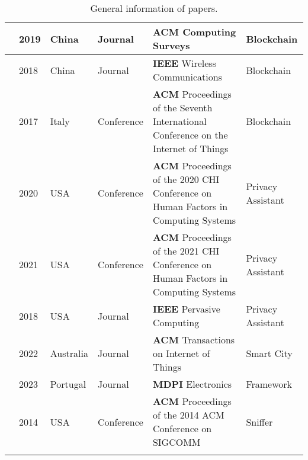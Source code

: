 \begin{footnotesize}
\begin{longtable}{p{1.2cm} p{1cm} p{1.6cm} p{3.2cm} p{5cm} p{3cm}}
        \cite{zhang2019security} & 2019 & China & Journal & \textbf{ACM} Computing Surveys & Blockchain \\
        \hline
        \cite{yu2018blockchain} & 2018 & China & Journal & \textbf{IEEE} Wireless Communications & Blockchain \\
        \hline
        \cite{AliIoT} & 2017 & Italy & Conference & \textbf{ACM} Proceedings of the Seventh International Conference on the Internet of Things & Blockchain \\
        \hline
        \cite{ColnagoInforming} & 2020 & USA & Conference & \textbf{ACM} Proceedings of the 2020 CHI Conference on Human Factors in Computing Systems & Privacy Assistant \\
        \hline
        \cite{FengDesign} & 2021 & USA & Conference & \textbf{ACM} Proceedings of the 2021 CHI Conference on Human Factors in Computing Systems & Privacy Assistant \\
        \hline
        \cite{DasPersonalized} & 2018 & USA & Journal & \textbf{IEEE} Pervasive Computing & Privacy Assistant \\
        \hline
        \cite{ZhuIntegrating} & 2022 & Australia & Journal & \textbf{ACM} Transactions on Internet of Things & Smart City \\
        \hline
        \cite{electronics12122589} & 2023 & Portugal & Journal & \textbf{MDPI} Electronics & Framework \\
        \hline
        \cite{KumarLTE} & 2014 & USA & Conference & \textbf{ACM} Proceedings of the 2014 ACM Conference on SIGCOMM & Sniffer \\
        \hline
        \caption{General information of papers.}
        \label{table:literature_overview}
    \end{longtable}
\end{footnotesize}

